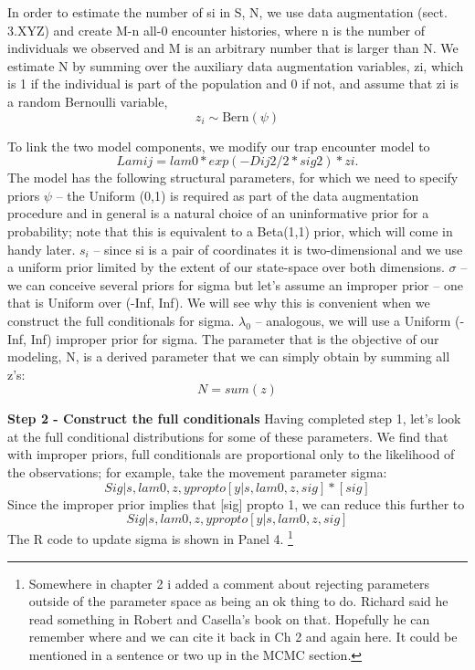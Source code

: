 In order to estimate the number of si in S, N, we use data augmentation (sect. 3.XYZ) and create M-n all-0 encounter histories, where n is the number of individuals we observed and M is an arbitrary number that is larger than N. We estimate N by summing over the auxiliary data augmentation variables, zi, which is 1 if the individual is part of the population and 0 if not, and assume that zi is a random Bernoulli variable,
\[
z_{i} \sim \mbox{Bern}(\psi)
\]


To link the two model components, we modify our trap encounter model to
\[
Lamij = lam0 * exp(-Dij2/2*sig2) * zi.
\]
The model has the following structural parameters, for which we need to specify priors
$\psi$ – the Uniform (0,1) is required as part of the data augmentation procedure and in general is a natural choice of an uninformative prior for a probability; note that this is equivalent to a Beta(1,1) prior, which will come in handy later.
$s_{i}$ – since si is a pair of coordinates it is two-dimensional and we use a uniform prior limited by the extent of our state-space over both dimensions.
$\sigma$ – we can conceive several priors for sigma but let's assume an improper prior – one that is Uniform over (-Inf, Inf). We will see why this is convenient when we construct the full conditionals for sigma.
$\lambda_{0}$ – analogous, we will use a Uniform (-Inf, Inf) improper prior for sigma.
The parameter that is the objective of our modeling, N, is a derived parameter that we can simply obtain by summing all z's:
\[
N=sum(z)
\]


{\bf Step 2 - Construct the full conditionals}
Having completed step 1, let's look at the full conditional distributions for some of these parameters.
We find that with improper priors, full conditionals are proportional only to the likelihood of the observations; for example, take the movement parameter sigma:
\[
Sig|s, lam0, z, y propto [y| s, lam0, z, sig] * [sig]
\]
Since the improper prior implies that [sig] propto 1, we can reduce this further to
\[
Sig|s, lam0, z, y propto [y| s, lam0, z, sig]
\]
The R code to update sigma is shown in Panel 4. \footnote{ Somewhere in chapter 2 i added a comment about rejecting parameters outside of the parameter space as being an ok thing to do. Richard said he read something in Robert and Casella’s book on that. Hopefully he can remember where and we can cite it back in Ch 2 and again here.  It could be mentioned in a sentence or two up in the MCMC section.}

